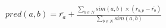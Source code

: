 \documentclass{article}
\begin{document}
$pred(a,b) = \bar{r_a} + \frac{\sum_{b \in N}{sim(a,b) \times (r_{b,p} - \bar{r_b})}}{\sum_{b \in N}{sim(a,b)}}$
\end{document}
